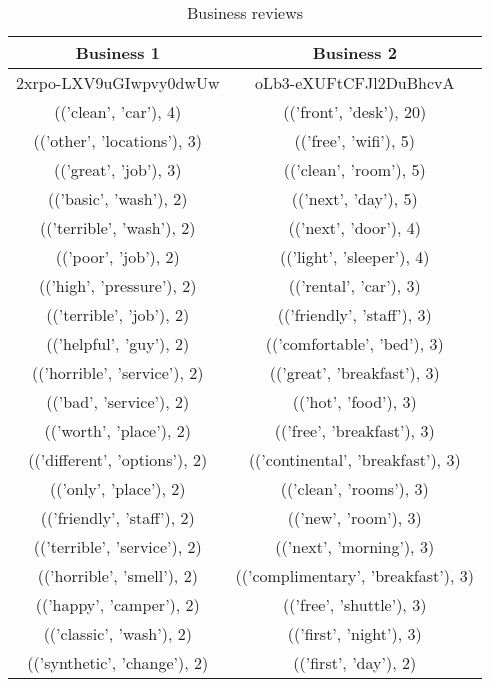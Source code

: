 	\begin{center}
		\tiny
		\begin{table}[!h]
		\caption{Business reviews}
		\begin{tabular}{c | c}
			\textbf{Business 1}			&\textbf{Business 2}\\ \hline
			2xrpo-LXV9uGIwpvy0dwUw		&oLb3-eXUFtCFJl2DuBhcvA\\\hline
			(('clean', 'car'), 4)		&(('front', 'desk'), 20)\\
			(('other', 'locations'), 3)		&(('free', 'wifi'), 5)\\
			(('great', 'job'), 3)		&(('clean', 'room'), 5)\\
			(('basic', 'wash'), 2)		&(('next', 'day'), 5)\\
			(('terrible', 'wash'), 2)		&(('next', 'door'), 4)\\
			(('poor', 'job'), 2)		&(('light', 'sleeper'), 4)\\
			(('high', 'pressure'), 2)		&(('rental', 'car'), 3)\\
			(('terrible', 'job'), 2)		&(('friendly', 'staff'), 3)\\
			(('helpful', 'guy'), 2)		&(('comfortable', 'bed'), 3)\\
			(('horrible', 'service'), 2)		&(('great', 'breakfast'), 3)\\
			(('bad', 'service'), 2)		&(('hot', 'food'), 3)\\
			(('worth', 'place'), 2)		&(('free', 'breakfast'), 3)\\
			(('different', 'options'), 2)		&(('continental', 'breakfast'), 3)\\
			(('only', 'place'), 2)		&(('clean', 'rooms'), 3)\\
			(('friendly', 'staff'), 2)		&(('new', 'room'), 3)\\
			(('terrible', 'service'), 2)		&(('next', 'morning'), 3)\\
			(('horrible', 'smell'), 2)		&(('complimentary', 'breakfast'), 3)\\
			(('happy', 'camper'), 2)		&(('free', 'shuttle'), 3)\\
			(('classic', 'wash'), 2)		&(('first', 'night'), 3)\\
			(('synthetic', 'change'), 2)		&(('first', 'day'), 2)\\
		\end{tabular}
	\end{table}
	\end{center}
